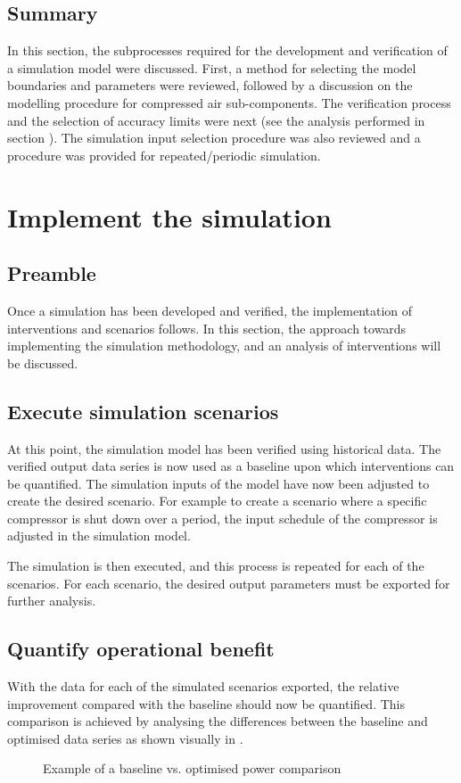 	\subsection{Summary}	
In this section, the subprocesses required for the development and verification of a simulation model were discussed. First, a method for selecting the model boundaries and parameters were reviewed, followed by a discussion on the modelling procedure for compressed air sub-components. The verification process and the selection of accuracy limits were next (see the analysis performed in section ). The simulation input selection procedure was also reviewed and a procedure was provided for repeated/periodic simulation.

\section{Implement the simulation}
	\subsection{Preamble}
		Once a simulation has been developed and verified, the implementation of interventions and scenarios follows. In this section, the approach towards implementing the simulation methodology, and an analysis of interventions will be discussed.
	\subsection{Execute simulation scenarios}
		At this point, the simulation model has been verified using historical data. The verified output data series is now used as a baseline upon which interventions can be quantified. The simulation inputs of the model have now been adjusted to create the desired scenario. For example to create a scenario where a specific compressor is shut down over a period, the input schedule of the compressor is adjusted in the simulation model.
		\par
		The simulation is then executed, and this process is repeated for each of the scenarios. For each scenario, the desired output parameters must be exported for further analysis.

	\subsection{Quantify operational benefit}
		With the data for each of the simulated scenarios exported, the relative improvement compared with the baseline should now be quantified. This comparison is achieved by analysing the differences between the baseline and optimised data series as shown visually in .
		\par 
		\begin{figure}[h]
			\centering
			
			\caption{Example of a baseline vs. optimised power comparison}
			\label{fig: Savings Power.}
		\end{figure} 
		
